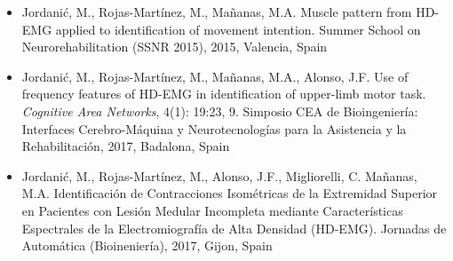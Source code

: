 \begin{itemize}
\item Jordanić, M., Rojas-Martínez, M., Mañanas, M.A. Muscle pattern from HD-EMG applied to identification of movement intention. Summer School on Neurorehabilitation (SSNR 2015), 2015, Valencia, Spain

\item   Jordanić, M., Rojas-Martínez, M., Mañanas, M.A., Alonso, J.F. Use of frequency features of HD-EMG in identification of upper-limb motor task. \textit{Cognitive Area Networks}, 4(1): 19:23, 9. Simposio CEA de Bioingeniería: Interfaces Cerebro-Máquina y Neurotecnologías para la Asistencia y la Rehabilitación, 2017, Badalona, Spain

\item Jordanić, M., Rojas-Martínez, M., Alonso, J.F., Migliorelli, C. Mañanas, M.A. Identificación de Contracciones Isométricas de la Extremidad Superior en Pacientes con Lesión Medular Incompleta mediante Características Espectrales de la Electromiografía de Alta Densidad (HD-EMG). Jornadas de Automática (Bioineniería), 2017, Gijon, Spain

\end{itemize}


